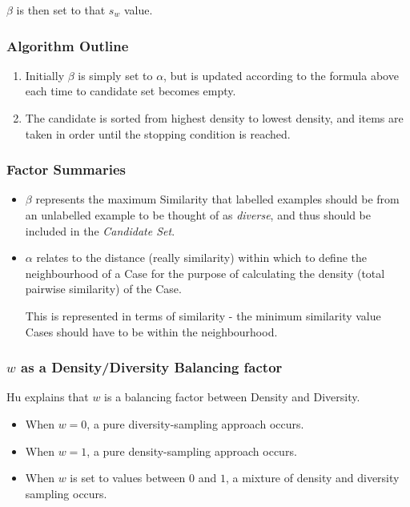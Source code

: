 \documentclass[a4paper,11pt]{report}
\begin{document}
$\beta$ is then set to that $s_{w}$ value.

\subsubsection{Algorithm Outline}
\begin{enumerate}
	\item Initially $\beta$ is simply set to $\alpha$, but is updated according to the formula above each time to candidate set becomes empty.
	\item The candidate is sorted from highest density to lowest density, and items are taken in order until the stopping condition is reached.
\end{enumerate}

\subsubsection{Factor Summaries}
\begin{itemize}
	\item $\beta$ represents the maximum Similarity that labelled examples should be from an unlabelled example to be thought of as \emph{diverse}, and thus should be included in the \emph{Candidate Set}.

	\item $\alpha$ relates to the distance (really similarity) within which to define the neighbourhood of a Case for the purpose of calculating the density (total pairwise similarity) of the Case. 
	
	This is represented in terms of similarity - the minimum similarity value Cases should have to be within the neighbourhood.
	
\end{itemize}

\subsubsection{$w$ as a Density/Diversity Balancing factor}
Hu explains that $w$ is a balancing factor between Density and Diversity\citep{Hu2010}. 

\begin{itemize}
	\item When $w=0$, a pure diversity-sampling approach occurs. 
	\item When $w=1$, a pure density-sampling approach occurs. 
	\item When $w$ is set to values between $0$ and $1$, a mixture of density and diversity sampling occurs.
\end{itemize}
\end{document}
